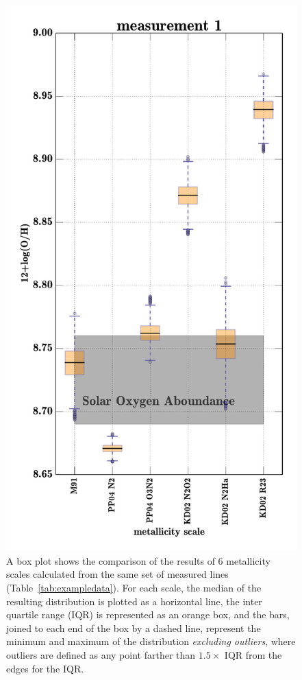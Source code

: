 \documentclass{emulateapj}
\begin{document}
\begin{figure}[ht!]
  \includegraphics[width=0.95\columnwidth]{exampledata_boxplot2000_m1.pdf}
   \caption{A box plot shows the comparison of the results of 6 metallicity scales calculated from the same set of measured lines (Table~\ref{tab:exampledata}). For each scale, the median of the resulting distribution is plotted as a horizontal line, the inter quartile range (IQR) is represented as an orange box, and the bars, joined to each end of the box by a dashed line, represent the minimum and maximum of the distribution \emph{excluding outliers}, where outliers are defined as any point farther than $1.5\times$ IQR from the edges for the IQR.}
 \label{boxplot}
\end{figure}
\end{document}
